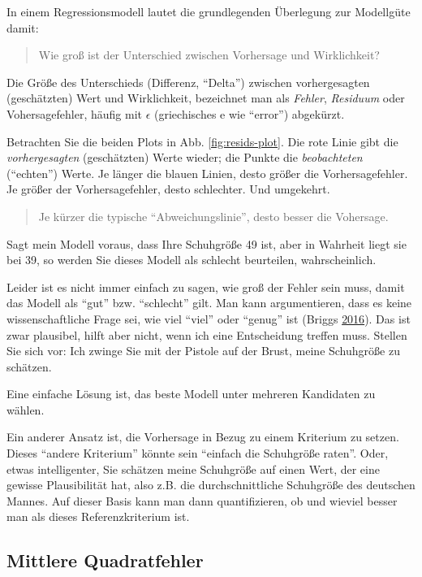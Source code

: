 \documentclass[12pt,ngerman,]{book}
\begin{document}
In einem Regressionsmodell lautet die grundlegenden Überlegung zur
Modellgüte damit:

\begin{quote}
Wie groß ist der Unterschied zwischen Vorhersage und Wirklichkeit?
\end{quote}

Die Größe des Unterschieds (Differenz, ``Delta'') zwischen
vorhergesagten (geschätzten) Wert und Wirklichkeit, bezeichnet man als
\emph{Fehler}, \emph{Residuum} oder Vohersagefehler, häufig mit
\(\epsilon\) (griechisches e wie ``error'') abgekürzt.

Betrachten Sie die beiden Plots in Abb. \ref{fig:resids-plot}. Die rote
Linie gibt die \emph{vorhergesagten} (geschätzten) Werte wieder; die
Punkte die \emph{beobachteten} (``echten'') Werte. Je länger die blauen
Linien, desto größer die Vorhersagefehler. Je größer der
Vorhersagefehler, desto schlechter. Und umgekehrt.

\begin{quote}
Je kürzer die typische ``Abweichungslinie'', desto besser die Vohersage.
\end{quote}

Sagt mein Modell voraus, dass Ihre Schuhgröße 49 ist, aber in Wahrheit
liegt sie bei 39, so werden Sie dieses Modell als schlecht beurteilen,
wahrscheinlich.

Leider ist es nicht immer einfach zu sagen, wie groß der Fehler sein
muss, damit das Modell als ``gut'' bzw. ``schlecht'' gilt. Man kann
argumentieren, dass es keine wissenschaftliche Frage sei, wie viel
``viel'' oder ``genug'' ist (Briggs
\protect\hyperlink{ref-uncertainty}{2016}). Das ist zwar plausibel,
hilft aber nicht, wenn ich eine Entscheidung treffen muss. Stellen Sie
sich vor: Ich zwinge Sie mit der Pistole auf der Brust, meine Schuhgröße
zu schätzen.

Eine einfache Lösung ist, das beste Modell unter mehreren Kandidaten zu
wählen.

Ein anderer Ansatz ist, die Vorhersage in Bezug zu einem Kriterium zu
setzen. Dieses ``andere Kriterium'' könnte sein ``einfach die Schuhgröße
raten''. Oder, etwas intelligenter, Sie schätzen meine Schuhgröße auf
einen Wert, der eine gewisse Plausibilität hat, also z.B. die
durchschnittliche Schuhgröße des deutschen Mannes. Auf dieser Basis kann
man dann quantifizieren, ob und wieviel besser man als dieses
Referenzkriterium ist.

\subsection{Mittlere Quadratfehler}\label{mittlere-quadratfehler}
\end{document}
